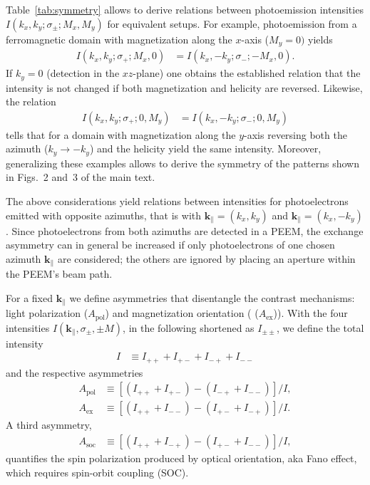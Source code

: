 \documentclass[amsfonts, amssymb, amsmath, preprint, showkeys, twoside, prl, superscriptaddress, aps]{revtex4-2}
\renewcommand{\vec}[1]{\boldsymbol{#1}}
\begin{document}
Table~\ref{tab:symmetry} allows to derive relations between photoemission intensities $I(k_{x}, k_{y}; \sigma_{\pm}; M_{x}, M_{y})$ for equivalent setups. For example, photoemission from a ferromagnetic domain with magnetization along the $x$-axis ($M_{y} = 0)$ yields
\begin{align}
    I(k_{x}, k_{y}; \sigma_{+}; M_{x}, 0) & = I(k_{x}, -k_{y}; \sigma_{-}; -M_{x}, 0).
\end{align}
If $k_{y} = 0$ (detection in the $xz$-plane) one obtains the established relation that the intensity is not changed if both magnetization and helicity are reversed. Likewise, the relation 
\begin{align}
    I(k_{x}, k_{y}; \sigma_{+}; 0, M_{y}) & = I(k_{x}, -k_{y}; \sigma_{-}; 0, M_{y})
\end{align}
tells that for a domain with magnetization along the $y$-axis reversing both the azimuth ($k_{y} \to -k_{y}$) and the helicity yield the same intensity. Moreover, generalizing these examples allows to derive the symmetry of the patterns shown in Figs.~2 and~3 of the main text.

The above considerations yield relations between intensities for photoelectrons emitted with opposite azimuths, that is with $\vec{k}_{\parallel} = (k_{x}, k_{y})$ and $\vec{k}_{\parallel} = (k_{x}, -k_{y})$. Since photoelectrons from both azimuths are detected in a PEEM, the exchange asymmetry can in general be increased if only photoelectrons of one chosen azimuth $\vec{k}_{\parallel}$ are considered; the others are ignored by placing an aperture within the PEEM's beam path. 

For a fixed $\vec{k}_{\parallel}$ we define asymmetries that disentangle the contrast mechanisms: light polarization ($A_{\mathrm{pol}}$) and magnetization orientation ( ($A_{\mathrm{ex}}$)). With the four intensities $I(\vec{k}_{\parallel}, \sigma_{\pm}, \pm M)$, in the following shortened as $I_{\pm \pm}$, we define the total intensity
\begin{align}
    I & \equiv I_{+ +} + I_{+ -} + I_{- +} + I_{- -}
\end{align}
and the respective asymmetries 
\begin{subequations}
\begin{align}
    A_{\mathrm{pol}} & \equiv \left[ \left( I_{+ +} + I_{+ -} \right) - \left( I_{- +} + I_{- -} \right) \right] / I,
    \label{eq:Apol}
    \\
    A_{\mathrm{ex}} & \equiv \left[ \left( I_{+ +} + I_{- -} \right) - \left( I_{+ -} + I_{- +} \right) \right] / I.
    \label{eq:Aex}
\end{align}    
\end{subequations}
A third asymmetry,
\begin{align}
    A_{\mathrm{soc}} & \equiv \left[ \left( I_{+ +} + I_{- +} \right) - \left( I_{+ -} + I_{- -} \right) \right] / I,
    \label{eq:Asoc}
\end{align}    
quantifies the spin polarization produced by optical orientation, aka Fano effect, which requires spin-orbit coupling (SOC).

 
    
\end{document}
